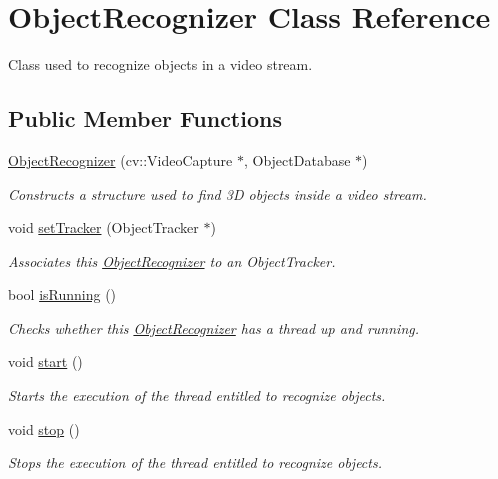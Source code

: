 \hypertarget{class_object_recognizer}{\section{Object\-Recognizer Class Reference}
\label{class_object_recognizer}
}


Class used to recognize objects in a video stream.  


\subsection*{Public Member Functions}
\begin{DoxyCompactItemize}
\item 
\hyperlink{class_object_recognizer_a8c2fbf624024bd7eedb302efe62f7c52}{Object\-Recognizer} (cv\-::\-Video\-Capture $\ast$, Object\-Database $\ast$)
\begin{DoxyCompactList}\small\item\em Constructs a structure used to find 3\-D objects inside a video stream. \end{DoxyCompactList}\item 
void \hyperlink{class_object_recognizer_ae76888682b92166cf53c93826912355d}{set\-Tracker} (Object\-Tracker $\ast$)
\begin{DoxyCompactList}\small\item\em Associates this \hyperlink{class_object_recognizer}{Object\-Recognizer} to an Object\-Tracker. \end{DoxyCompactList}\item 
bool \hyperlink{class_object_recognizer_a5ebfeb7eb238b9349fc9740fb6bd397b}{is\-Running} ()
\begin{DoxyCompactList}\small\item\em Checks whether this \hyperlink{class_object_recognizer}{Object\-Recognizer} has a thread up and running. \end{DoxyCompactList}\item 
\hypertarget{class_object_recognizer_aa60960cf23a3b65d40484f8a35248c20}{void \hyperlink{class_object_recognizer_aa60960cf23a3b65d40484f8a35248c20}{start} ()}\label{class_object_recognizer_aa60960cf23a3b65d40484f8a35248c20}

\begin{DoxyCompactList}\small\item\em Starts the execution of the thread entitled to recognize objects. \end{DoxyCompactList}\item 
\hypertarget{class_object_recognizer_aec395a877f984759af0a70bdcf50667b}{void \hyperlink{class_object_recognizer_aec395a877f984759af0a70bdcf50667b}{stop} ()}\label{class_object_recognizer_aec395a877f984759af0a70bdcf50667b}

\begin{DoxyCompactList}\small\item\em Stops the execution of the thread entitled to recognize objects. \end{DoxyCompactList}\end{DoxyCompactItemize}
